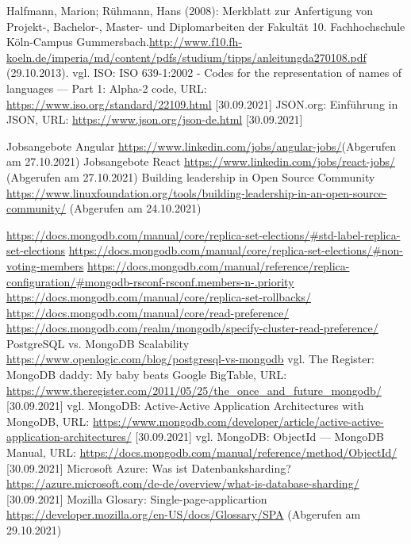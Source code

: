 \begin{thebibliography}{HR08}
 Halfmann, Marion; Rühmann, Hans (2008): Merkblatt zur Anfertigung von Projekt-, Bachelor-, Master- und Diplomarbeiten der Fakultät 10. Fachhochschule Köln-Campus Gummersbach.\url{http://www.f10.fh-koeln.de/imperia/md/content/pdfs/studium/tipps/anleitungda270108.pdf} (29.10.2013).
 vgl. ISO: ISO 639-1:2002 - Codes for the representation of names of languages — Part 1: Alpha-2 code, URL: \url{https://www.iso.org/standard/22109.html} [30.09.2021]
 JSON.org: Einführung in JSON, URL: \url{https://www.json.org/json-de.html} [30.09.2021]

 Jobsangebote Angular \url{https://www.linkedin.com/jobs/angular-jobs/}(Abgerufen am 27.10.2021)
 Jobsangebote React \url{https://www.linkedin.com/jobs/react-jobs/}  (Abgerufen am 27.10.2021)
Building leadership in Open Source Community \url{https://www.linuxfoundation.org/tools/building-leadership-in-an-open-source-community/} (Abgerufen am 24.10.2021)

 \url{https://docs.mongodb.com/manual/core/replica-set-elections/#std-label-replica-set-elections}
 \url{https://docs.mongodb.com/manual/core/replica-set-elections/#non-voting-members}
 \url{https://docs.mongodb.com/manual/reference/replica-configuration/#mongodb-rsconf-rsconf.members-n-.priority}
 \url{https://docs.mongodb.com/manual/core/replica-set-rollbacks/}
 \url{https://docs.mongodb.com/manual/core/read-preference/}
 \url{https://docs.mongodb.com/realm/mongodb/specify-cluster-read-preference/}
 PostgreSQL vs. MongoDB Scalability \url{https://www.openlogic.com/blog/postgresql-vs-mongodb}
 vgl. The Register: MongoDB daddy: My baby beats Google BigTable, URL: \url{https://www.theregister.com/2011/05/25/the_once_and_future_mongodb/} [30.09.2021]
 vgl. MongoDB: Active-Active Application Architectures with MongoDB, URL: \url{https://www.mongodb.com/developer/article/active-active-application-architectures/} [30.09.2021]
 vgl. MongoDB: ObjectId — MongoDB Manual, URL: \url{https://docs.mongodb.com/manual/reference/method/ObjectId/} [30.09.2021]
 Microsoft Azure: Was ist Datenbanksharding? \url{https://azure.microsoft.com/de-de/overview/what-is-database-sharding/} [30.09.2021]
 Mozilla Glosary: Single-page-applicartion \url{https://developer.mozilla.org/en-US/docs/Glossary/SPA} (Abgerufen am 29.10.2021)


\end{thebibliography}
